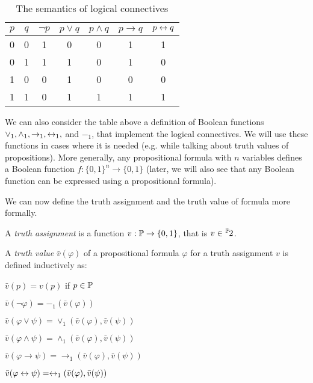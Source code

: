 \begin{table}[h]
\centering
\caption{The semantics of logical connectives}
\label{tab:prop_semantics}
\begin{tabular}{cc|ccccc}
\toprule
$p$ & $q$ & $\neg p$ & $p \lor q$ & $p \land q$ & $p \to q$ & $p \leftrightarrow q$ \\
\midrule
0 & 0 & 1 & 0 & 0 & 1 & 1 \\
0 & 1 & 1 & 1 & 0 & 1 & 0 \\
1 & 0 & 0 & 1 & 0 & 0 & 0 \\
1 & 1 & 0 & 1 & 1 & 1 & 1 \\
\bottomrule
\end{tabular}
\end{table}

We can also consider the table above a definition of Boolean functions $\lor_1, \land_1, \to_1, \leftrightarrow_1,$ and $-_1$, that implement the logical connectives. We will use these functions in cases where it is needed (e.g. while talking about truth values of propositions). More generally, any propositional formula with $n$ variables defines a Boolean function $f: \{0,1\}^n \to \{0,1\}$ (later, we will also see that any Boolean function can be expressed using a propositional formula).

We can now define the truth assignment and the truth value of formula more formally.

\begin{definition}
A \emph{truth assignment} is a function $v: \mathbb{P} \to \{0,1\}$, that is $v \in \fset{\Prop}{2}$.

A \emph{truth value} $\bar{v}(\varphi)$ of a propositional formula $\varphi$ for a truth assignment $v$ is defined inductively as:
	\begin{itemize}
		\begin{minipage}{0.5\textwidth}
		\item $\bar{v}(p) = v(p)$ if $p \in \mathbb{P}$
		\item $\bar{v}(\neg \varphi) = -_1(\bar{v}(\varphi))$ 
		\item $\bar{v}(\varphi \lor \psi) = \lor_1(\bar{v}(\varphi),\bar{v}(\psi))$ 
		\end{minipage}
		\begin{minipage}{0.5\textwidth}
		\item $\bar{v}(\varphi \land \psi) = \land_1(\bar{v}(\varphi),\bar{v}(\psi))$ 
		\item $\bar{v}(\varphi \to \psi) = \to_1(\bar{v}(\varphi),\bar{v}(\psi))$ 
		\item $\bar{v}(\varphi \leftrightarrow \psi) = \leftrightarrow_1(\bar{v}(\varphi),\bar{v}(\psi))$ 
		\end{minipage}
	\end{itemize}
\end{definition}


